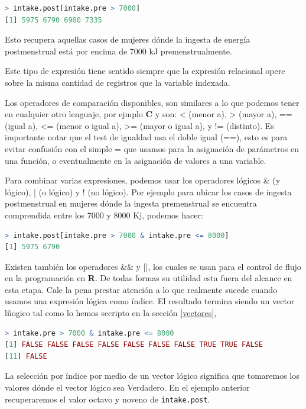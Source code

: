 \documentclass[spanish]{extbook}
\numberwithin{equation}{section}
\numberwithin{figure}{section}
\begin{document}
\begin{lstlisting}[language=R]
> intake.post[intake.pre > 7000]
[1] 5975 6790 6900 7335
\end{lstlisting}

Esto recupera aquellas casos de mujeres dónde la ingesta de energía
postmenstrual está por encima de 7000 kJ premenstrualmente.

Este tipo de expresión tiene sentido siempre que la expresión relacional opere
sobre la misma cantidad de registros que la variable indexada.

Los operadores de comparación disponibles, son similares a lo que podemos tener
en cualquier otro lenguaje, por ejmplo \textbf{C} y son: < (menor a), > (mayor
a), == (igual a), <= (menor o igual a), >= (mayor o igual a), y != (distinto).
Es importante notar que el test de igualdad usa el doble igual (==), esto es
para evitar confusión con el simple = que usamos para la asignación de
parámetros en una función, o eventualmente en la asignación de valores a una
variable.

Para combinar varias expresiones, podemos usar los operadores lógicos \& (y
lógico), | (o lógico) y ! (no lógico). Por ejemplo para ubicar los casos de
ingesta postmenstrual en mujeres dónde la ingesta premenstrual se encuentra
comprendida entre los 7000 y 8000 Kj, podemos hacer:

\begin{lstlisting}[language=R]
> intake.post[intake.pre > 7000 & intake.pre <= 8000]
[1] 5975 6790
\end{lstlisting}

Existen también los operadores \&\& y ||, los cuales se usan para el control de
flujo en la programación en \textbf{R}. De todas formas su utilidad esta fuera
del alcance en esta etapa.  Cale la pena prestar atención a lo que realmente
sucede cuando usamos una expresión lógica como índice. El resultado termina
siendo un vector lñogico tal como lo hemos secripto en la sección
\ref{vectores}, 

\begin{lstlisting}[language=R]
> intake.pre > 7000 & intake.pre <= 8000
[1] FALSE FALSE FALSE FALSE FALSE FALSE FALSE TRUE TRUE FALSE
[11] FALSE
\end{lstlisting}

La selección por índice por medio de un vector lógico significa que tomaremos
los valores dónde el vector lógico sea Verdadero. En el ejemplo anterior
recuperaremos el valor octavo y noveno de \texttt{intake.post}.
\end{document}
